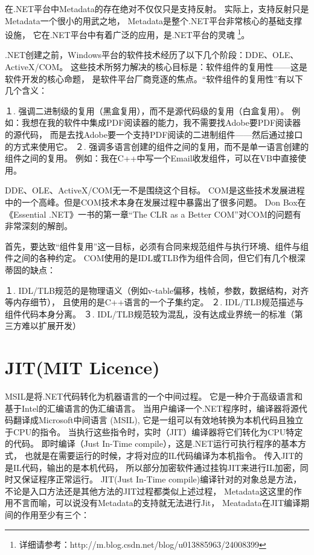 \documentclass{book}
\begin{document}
在.NET平台中Metadata的存在绝对不仅仅只是支持反射。
实际上，支持反射只是Metadata一个很小的用武之地，
Metadata是整个.NET平台非常核心的基础支撑设施，
它在.NET平台中有着广泛的应用，是.NET平台的灵魂
\footnote{详细请参考：http://m.blog.csdn.net/blog/u013885963/24008399}。

.NET创建之前，Windows平台的软件技术经历了以下几个阶段：DDE、OLE、ActiveX/COM。
这些技术所努力解决的核心目标是：软件组件的复用性——这是软件开发的核心命题，
是软件平台厂商竞逐的焦点。“软件组件的复用性”有以下几个含义：

１. 强调二进制级的复用（黑盒复用），而不是源代码级的复用（白盒复用）。 
例如：我想在我的软件中集成PDF阅读器的能力，我不需要找Adobe要PDF阅读器的源代码，
而是去找Adobe要一个支持PDF阅读的二进制组件——然后通过接口的方式来使用它。 
２. 强调多语言创建的组件之间的复用，而不是单一语言创建的组件之间的复用。 
例如：我在C++中写一个Email收发组件，可以在VB中直接使用。

DDE、OLE、ActiveX/COM无一不是围绕这个目标。
COM是这些技术发展进程中的一个高峰。但是COM技术本身在发展过程中暴露出了很多问题。
Don Box在《Essential .NET》一书的第一章“The CLR as a Better COM”对COM的问题有非常深刻的解剖。

首先，要达致“组件复用”这一目标，必须有合同来规范组件与执行环境、组件与组件之间的各种约定。
COM使用的是IDL或TLB作为组件合同，但它们有几个根深蒂固的缺点：

１. IDL/TLB规范的是物理语义（例如v-table偏移，栈帧，参数，数据结构，对齐等内存细节），
且使用的是C++语言的一个子集约定。 
２. IDL/TLB规范描述与组件代码本身分离。 
３. IDL/TLB规范较为混乱，没有达成业界统一的标准（第三方难以扩展开发）

\section{JIT(MIT Licence)}

MSIL是将.NET代码转化为机器语言的一个中间过程。
它是一种介于高级语言和基于Intel的汇编语言的伪汇编语言。
当用户编译一个.NET程序时，编译器将源代码翻译成Microsoft中间语言 (MSIL),
它是一组可以有效地转换为本机代码且独立于CPU的指令。
当执行这些指令时，实时（JIT）编译器将它们转化为CPU特定的代码。
即时编译（Just In-Time compile），这是.NET运行可执行程序的基本方式，
也就是在需要运行的时候，才将对应的IL代码编译为本机指令。
传入JIT的是IL代码，输出的是本机代码，
所以部分加密软件通过挂钩JIT来进行IL加密，同时又保证程序正常运行。
JIT(Just In-Time compile)编译针对的对象总是方法，
不论是入口方法还是其他方法的JIT过程都类似上述过程，
Metadata这这里的作用不言而喻，可以说没有Metadata的支持就无法进行Jit，
Meatadata在JIT编译期间的作用至少有三个：
\end{document}
